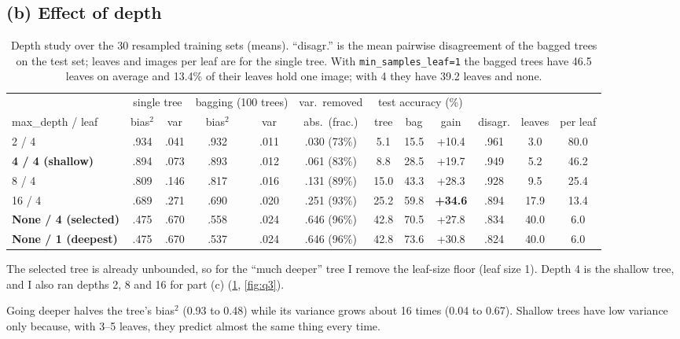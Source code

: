\documentclass[10pt,twocolumn,letterpaper]{article}
\begin{document}
\subsection{(b) Effect of depth}
\begin{table}[t]
\centering\small
\begin{tabular}{lccccccccccc}
\toprule
& \multicolumn{2}{c}{single tree} & \multicolumn{2}{c}{bagging (100 trees)} & var.\ removed & \multicolumn{3}{c}{test accuracy (\%)} & & & \\
\cmidrule(lr){2-3}\cmidrule(lr){4-5}\cmidrule(lr){7-9}
max\_depth / leaf & bias$^2$ & var & bias$^2$ & var & abs.\ (frac.) & tree & bag & gain & disagr. & leaves & per leaf\\
\midrule
2 / 4  & .934 & .041 & .932 & .011 & .030 (73\%) & 5.1  & 15.5 & +10.4 & .961 & 3.0  & 80.0\\
\textbf{4 / 4 (shallow)}  & .894 & .073 & .893 & .012 & .061 (83\%) & 8.8  & 28.5 & +19.7 & .949 & 5.2  & 46.2\\
8 / 4  & .809 & .146 & .817 & .016 & .131 (89\%) & 15.0 & 43.3 & +28.3 & .928 & 9.5  & 25.4\\
16 / 4 & .689 & .271 & .690 & .020 & .251 (93\%) & 25.2 & 59.8 & \textbf{+34.6} & .894 & 17.9 & 13.4\\
\textbf{None / 4 (selected)} & .475 & .670 & .558 & .024 & .646 (96\%) & 42.8 & 70.5 & +27.8 & .834 & 40.0 & 6.0\\
\textbf{None / 1 (deepest)}  & .475 & .670 & .537 & .024 & .646 (96\%) & 42.8 & 73.6 & +30.8 & .824 & 40.0 & 6.0\\
\bottomrule
\end{tabular}
\caption{Depth study over the 30 resampled training sets (means). ``disagr.''
is the mean pairwise disagreement of the bagged trees on the test set; leaves
and images per leaf are for the single tree. With
\texttt{min\_samples\_leaf=1} the bagged trees have 46.5 leaves on average and
13.4\% of their leaves hold one image; with 4 they have 39.2 leaves and none.}
\label{tab:depth}
\end{table}

The selected tree is already unbounded, so for the ``much deeper'' tree I
remove the leaf-size floor (leaf size 1). Depth 4 is the shallow tree, and I
also ran depths 2, 8 and 16 for part (c) (\cref{tab:depth}, \cref{fig:q3}).

Going deeper halves the tree's bias$^2$ (0.93 to 0.48) while its variance
grows about 16 times (0.04 to 0.67). Shallow trees have low variance only
because, with 3--5 leaves, they predict almost the same thing every time.
\end{document}
